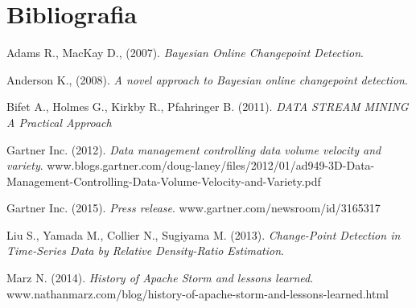 \chapter*{Bibliografia}

\begin{references}

\item
Adams R., MacKay D., (2007).
\textit{Bayesian Online Changepoint Detection}.

\item
Anderson K., (2008).
\textit{A novel approach to Bayesian online changepoint detection}.

\item
Bifet A., Holmes G., Kirkby R., Pfahringer B. (2011).
\textit{DATA STREAM MINING A Practical Approach}

\item
Gartner Inc. (2012).
\textit{Data management controlling data volume velocity and variety}.
www.blogs.gartner.com/doug-laney/files/2012/01/ad949-3D-Data-Management-Controlling-Data-Volume-Velocity-and-Variety.pdf

\item
Gartner Inc. (2015).
\textit{Press release}.
www.gartner.com/newsroom/id/3165317

\item
Liu S., Yamada M., Collier N., Sugiyama M. (2013).
\textit{Change-Point Detection in Time-Series Data by Relative Density-Ratio Estimation}.

\item
Marz N. (2014).
\textit{History of Apache Storm and lessons learned}.
www.nathanmarz.com/blog/history-of-apache-storm-and-lessons-learned.html

\end{references}
